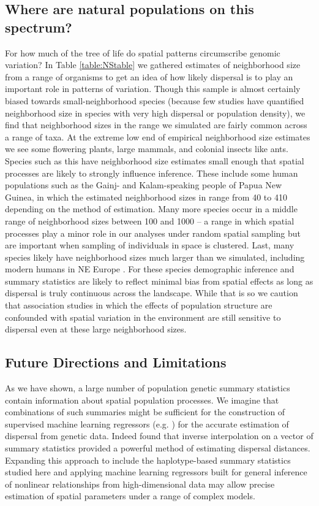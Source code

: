 \documentclass[11pt,twoside,lineno]{preprint}
\begin{document}
\subsection{Where are natural populations on this spectrum?}
For how much of the tree of life do spatial patterns circumscribe genomic variation? In Table \ref{table:NStable} we gathered estimates of neighborhood size from a range of organisms to get an idea of how likely dispersal is to play an important role in patterns of variation. Though this sample is almost certainly biased towards small-neighborhood species (because few studies have quantified neighborhood size in species with very high dispersal or population density), we find that neighborhood sizes in the range we simulated are fairly common across a range of taxa. At the extreme low end of empirical neighborhood size estimates we see some flowering plants, large mammals, and colonial insects like ants. Species such as this have neighborhood size estimates small enough that spatial processes are likely to strongly influence inference. These include some human populations such as the Gainj- and Kalam-speaking people of Papua New Guinea, in which the estimated neighborhood sizes in \citep{Rousset1997} range from 40 to 410 depending on the method of estimation. Many more species occur in a middle range of neighborhood sizes between 100 and 1000 -- a range in which spatial processes play a minor role in our analyses under random spatial sampling but are important when sampling of individuals in space is clustered. Last, many species likely have neighborhood sizes much larger than we simulated, including modern humans in NE Europe \citep{Ringbauer2017}. For these species demographic inference and summary statistics are likely to reflect minimal bias from spatial effects as long as dispersal is truly continuous across the landscape. While that is so we caution that association studies in which the effects of population structure are confounded with spatial variation in the environment are still sensitive to dispersal even at these large neighborhood sizes.

\subsection{Future Directions and Limitations}
As we have shown, a large number of population genetic summary statistics contain information about spatial population processes. We imagine that combinations of such summaries might be sufficient for the construction of supervised machine learning regressors (e.g. \cite{Schrider2018}) for the accurate estimation of dispersal from genetic data. Indeed \cite{Ashander2018} found that inverse interpolation on a vector of summary statistics provided a powerful method of estimating dispersal distances. Expanding this approach to include the haplotype-based summary statistics studied here and applying machine learning regressors built for general inference of nonlinear relationships from high-dimensional data may allow precise estimation of spatial parameters under a range of complex models. 
\end{document}
